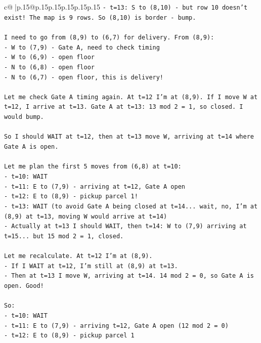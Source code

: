 \documentclass{article}
\begin{document}
{\begin{supertabular}{c@{$\;$}|p{.15\linewidth}@{}p{.15\linewidth}p{.15\linewidth}p{.15\linewidth}p{.15\linewidth}p{.15\linewidth}}
{{{\texttt{{-} t=13: S to (8,10) {-} but row 10 doesn't exist! The map is 9 rows. So (8,10) is border {-} bump.} \\
\\ 
\texttt{I need to go from (8,9) to (6,7) for delivery. From (8,9):} \\
\texttt{{-} W to (7,9) {-} Gate A, need to check timing} \\
\texttt{{-} W to (6,9) {-} open floor} \\
\texttt{{-} N to (6,8) {-} open floor} \\
\texttt{{-} N to (6,7) {-} open floor, this is delivery!} \\
\\ 
\texttt{Let me check Gate A timing again. At t=12 I'm at (8,9). If I move W at t=12, I arrive at t=13. Gate A at t=13: 13 mod 2 = 1, so closed. I would bump.} \\
\\ 
\texttt{So I should WAIT at t=12, then at t=13 move W, arriving at t=14 where Gate A is open.} \\
\\ 
\texttt{Let me plan the first 5 moves from (6,8) at t=10:} \\
\texttt{{-} t=10: WAIT} \\
\texttt{{-} t=11: E to (7,9) {-} arriving at t=12, Gate A open} \\
\texttt{{-} t=12: E to (8,9) {-} pickup parcel 1!} \\
\texttt{{-} t=13: WAIT (to avoid Gate A being closed at t=14... wait, no, I'm at (8,9) at t=13, moving W would arrive at t=14)} \\
\texttt{{-} Actually at t=13 I should WAIT, then t=14: W to (7,9) arriving at t=15... but 15 mod 2 = 1, closed. } \\
\\ 
\texttt{Let me recalculate. At t=12 I'm at (8,9). } \\
\texttt{{-} If I WAIT at t=12, I'm still at (8,9) at t=13.} \\
\texttt{{-} Then at t=13 I move W, arriving at t=14. 14 mod 2 = 0, so Gate A is open. Good!} \\
\\ 
\texttt{So:} \\
\texttt{{-} t=10: WAIT} \\
\texttt{{-} t=11: E to (7,9) {-} arriving t=12, Gate A open (12 mod 2 = 0)} \\
\texttt{{-} t=12: E to (8,9) {-} pickup parcel 1} \\
}}}
\end{supertabular}}
\end{document}
